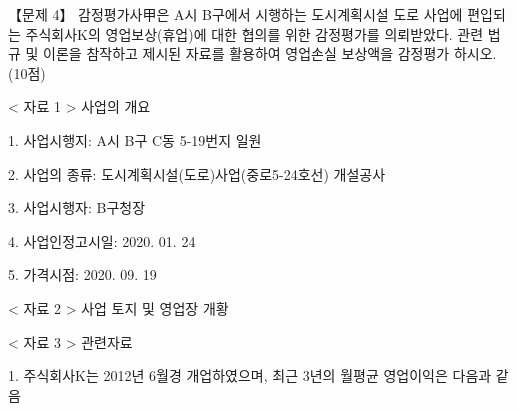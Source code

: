 \begin{longquestion}{【문제 4】}
감정평가사甲은 A시 B구에서 시행하는 도시계획시설 도로 사업에 편입되는 주식회사K의 영업보상(휴업)에 대한 협의를 위한 감정평가를 의뢰받았다. 관련 법규 및 이론을 참작하고 제시된 자료를 활용하여 영업손실 보상액을 감정평가 하시오. (10점) \par
< 자료 1 > 사업의 개요 \par
1. 사업시행지: A시 B구 C동 5-19번지 일원 \par
2. 사업의 종류: 도시계획시설(도로)사업(중로5-24호선) 개설공사 \par
3. 사업시행자: B구청장 \par
4. 사업인정고시일: 2020. 01. 24 \par
5. 가격시점: 2020. 09. 19 \par
< 자료 2 > 사업 토지 및 영업장 개황 \par
{}
< 자료 3 > 관련자료 \par
1. 주식회사K는 2012년 6월경 개업하였으며, 최근 3년의 월평균 영업이익은 다음과 같음 \par
{\small\centering\renewcommand{\arraystretch}{1.25}
\par}


\end{longquestion}
